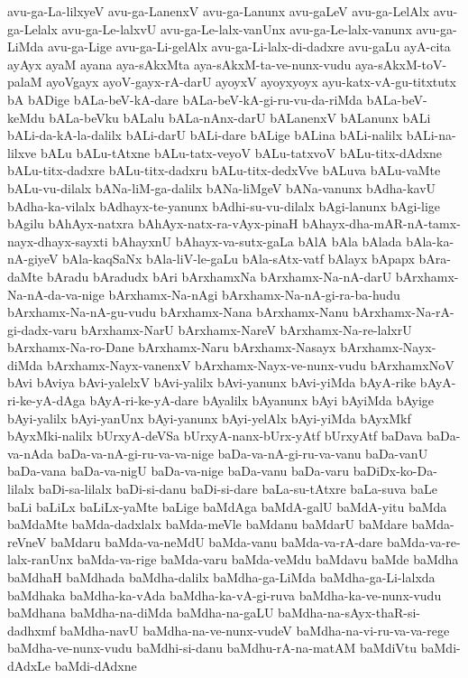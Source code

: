 {avu-ga-La-lilxyeV
avu-ga-LanenxV
avu-ga-Lanunx
avu-gaLeV
avu-ga-LelAlx
avu-ga-Lelalx
avu-ga-Le-lalxvU
avu-ga-Le-lalx-vanUnx
avu-ga-Le-lalx-vanunx
avu-ga-LiMda
avu-ga-Lige
avu-ga-Li-gelAlx
avu-ga-Li-lalx-di-dadxre
avu-gaLu
ayA-cita
ayAyx
ayaM
ayana
aya-sAkxMta
aya-sAkxM-ta-ve-nunx-vudu
aya-sAkxM-toV-palaM
ayoVgayx
ayoV-gayx-rA-darU
ayoyxV
ayoyxyoyx
ayu-katx-vA-gu-titxtutx
bA
bADige
bALa-beV-kA-dare
bALa-beV-kA-gi-ru-vu-da-riMda
bALa-beV-keMdu
bALa-beVku
bALalu
bALa-nAnx-darU
bALanenxV
bALanunx
bALi
bALi-da-kA-la-dalilx
bALi-darU
bALi-dare
bALige
bALina
bALi-nalilx
bALi-na-lilxve
bALu
bALu-tAtxne
bALu-tatx-veyoV
bALu-tatxvoV
bALu-titx-dAdxne
bALu-titx-dadxre
bALu-titx-dadxru
bALu-titx-dedxVve
bALuva
bALu-vaMte
bALu-vu-dilalx
bANa-liM-ga-dalilx
bANa-liMgeV
bANa-vanunx
bAdha-kavU
bAdha-ka-vilalx
bAdhayx-te-yanunx
bAdhi-su-vu-dilalx
bAgi-lanunx
bAgi-lige
bAgilu
bAhAyx-natxra
bAhAyx-natx-ra-vAyx-pinaH
bAhayx-dha-mAR-nA-tamx-nayx-dhayx-sayxti
bAhayxnU
bAhayx-va-sutx-gaLa
bAlA
bAla
bAlada
bAla-ka-nA-giyeV
bAla-kaqSaNx
bAla-liV-le-gaLu
bAla-sAtx-vatf
bAlayx
bApapx
bAra-daMte
bAradu
bAradudx
bAri
bArxhamxNa
bArxhamx-Na-nA-darU
bArxhamx-Na-nA-da-va-nige
bArxhamx-Na-nAgi
bArxhamx-Na-nA-gi-ra-ba-hudu
bArxhamx-Na-nA-gu-vudu
bArxhamx-Nana
bArxhamx-Nanu
bArxhamx-Na-rA-gi-dadx-varu
bArxhamx-NarU
bArxhamx-NareV
bArxhamx-Na-re-lalxrU
bArxhamx-Na-ro-Dane
bArxhamx-Naru
bArxhamx-Nasayx
bArxhamx-Nayx-diMda
bArxhamx-Nayx-vanenxV
bArxhamx-Nayx-ve-nunx-vudu
bArxhamxNoV
bAvi
bAviya
bAvi-yalelxV
bAvi-yalilx
bAvi-yanunx
bAvi-yiMda
bAyA-rike
bAyA-ri-ke-yA-dAga
bAyA-ri-ke-yA-dare
bAyalilx
bAyanunx
bAyi
bAyiMda
bAyige
bAyi-yalilx
bAyi-yanUnx
bAyi-yanunx
bAyi-yelAlx
bAyi-yiMda
bAyxMkf
bAyxMki-nalilx
bUrxyA-deVSa
bUrxyA-nanx-bUrx-yAtf
bUrxyAtf
baDava
baDa-va-nAda
baDa-va-nA-gi-ru-va-va-nige
baDa-va-nA-gi-ru-va-vanu
baDa-vanU
baDa-vana
baDa-va-nigU
baDa-va-nige
baDa-vanu
baDa-varu
baDiDx-ko-Da-lilalx
baDi-sa-lilalx
baDi-si-danu
baDi-si-dare
baLa-su-tAtxre
baLa-suva
baLe
baLi
baLiLx
baLiLx-yaMte
baLige
baMdAga
baMdA-galU
baMdA-yitu
baMda
baMdaMte
baMda-dadxlalx
baMda-meVle
baMdanu
baMdarU
baMdare
baMda-reVneV
baMdaru
baMda-va-neMdU
baMda-vanu
baMda-va-rA-dare
baMda-va-re-lalx-ranUnx
baMda-va-rige
baMda-varu
baMda-veMdu
baMdavu
baMde
baMdha
baMdhaH
baMdhada
baMdha-dalilx
baMdha-ga-LiMda
baMdha-ga-Li-lalxda
baMdhaka
baMdha-ka-vAda
baMdha-ka-vA-gi-ruva
baMdha-ka-ve-nunx-vudu
baMdhana
baMdha-na-diMda
baMdha-na-gaLU
baMdha-na-sAyx-thaR-si-dadhxmf
baMdha-navU
baMdha-na-ve-nunx-vudeV
baMdha-na-vi-ru-va-va-rege
baMdha-ve-nunx-vudu
baMdhi-si-danu
baMdhu-rA-na-matAM
baMdiVtu
baMdi-dAdxLe
baMdi-dAdxne
}
